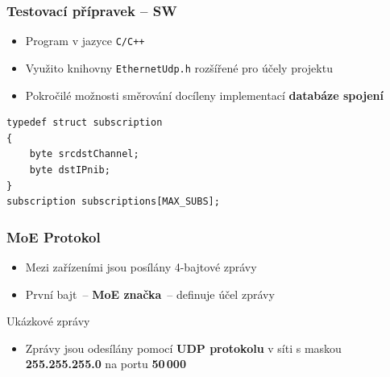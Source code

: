 \documentclass[%
  12pt,       				%
	t,                  %
	aspectratio=1610,   %
	unicode,						%
]{beamer}				    	%
\begin{document}
\begin{frame}[fragile]
	\frametitle{Testovací přípravek -- SW}
	\begin{itemize}
		\item Program v jazyce \texttt{C/C++}
		\item Využito knihovny \texttt{EthernetUdp.h} rozšířené pro účely projektu
		\item Pokročilé možnosti směrování docíleny implementací \textbf{databáze spojení}
	\end{itemize}
	\begin{lstlisting}
typedef struct subscription
{
	byte srcdstChannel;
	byte dstIPnib;
}
subscription subscriptions[MAX_SUBS];
	\end{lstlisting}
\end{frame}

\begin{frame}
	\frametitle{MoE Protokol}
	\begin{itemize}
		\item Mezi zařízeními jsou posílány 4-bajtové zprávy
		\item První bajt~-- \textbf{MoE značka}~-- definuje účel zprávy
	\end{itemize}
	\vspace{3ex}
	\begin{block}{Ukázkové zprávy}
	\end{block}
	\vspace{3ex}
	\begin{itemize}
		\item Zprávy jsou odesílány pomocí \textbf{UDP protokolu} v síti s maskou \textbf{255.255.255.0} na portu \textbf{50\,000}
	\end{itemize}
\end{frame}
\end{document}
